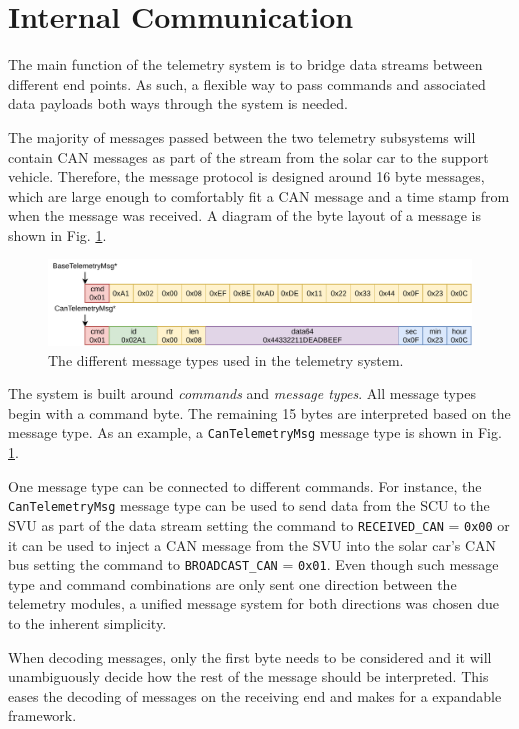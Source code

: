 \documentclass[a4paper,conference]{IEEEtran}
\begin{document}
\section{Internal Communication}
The main function of the telemetry system is to bridge data streams between different end points. As such, a flexible way to pass commands and associated data payloads both ways through the system is needed. 

The majority of messages passed between the two telemetry subsystems will contain CAN messages as part of the stream from the solar car to the support vehicle. Therefore, the message protocol is designed around 16 byte messages, which are large enough to comfortably fit a CAN message and a time stamp from when the message was received. A diagram of the byte layout of a message is shown in Fig. \ref{fig:messageTypes}.

\begin{figure}
    \centering
    \includegraphics[width=\linewidth]{documentation/images/MessageTypes.pdf}
    \caption{The different message types used in the telemetry system.}
    \label{fig:messageTypes}
\end{figure}

The system is built around \textit{commands} and \textit{message types}. All message types begin with a command byte. The remaining 15 bytes are interpreted based on the message type. As an example, a \texttt{CanTelemetryMsg} message type is shown in Fig. \ref{fig:messageTypes}. 

One message type can be connected to different commands. For instance, the \texttt{CanTelemetryMsg} message type can be used to send data from the SCU to the SVU as part of the data stream setting the command to \texttt{RECEIVED\_CAN} = \texttt{0x00} or it can be used to inject a CAN message from the SVU into the solar car's CAN bus setting the command to \texttt{BROADCAST\_CAN} = \texttt{0x01}. Even though such message type and command combinations are only sent one direction between the telemetry modules, a unified message system for both directions was chosen due to the inherent simplicity.

When decoding messages, only the first byte needs to be considered and it will unambiguously decide how the rest of the message should be interpreted. This eases the decoding of messages on the receiving end and makes for a expandable framework. 
\end{document}
